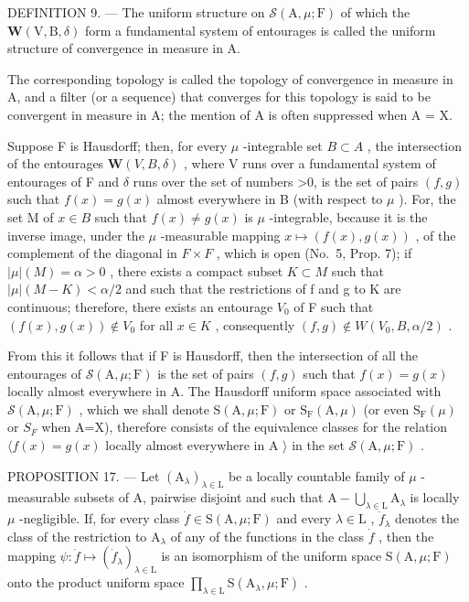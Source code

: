 DEFINITION 9. --- The uniform structure on \(\mathcal{S}(\mathrm{A},\mu;\mathrm{F})\) of which the \(\boldsymbol{W}(\mathrm{V},\mathrm{B},\delta)\) form a fundamental system of entourages is called the uniform structure of convergence in measure in A.

The corresponding topology is called the topology of convergence in measure in A, and a filter (or a sequence) that converges for this topology is said to be convergent in measure in A; the mention of A is often suppressed when A = X.

Suppose F is Hausdorff; then, for every \(\mu\) -integrable set \(B \subset A\) , the intersection of the entourages \(\boldsymbol{W}(V, B, \delta)\) , where V runs over a fundamental system of entourages of F and \(\delta\) runs over the set of numbers \textgreater0, is the set of pairs \((f, g)\) such that \(f(x) = g(x)\) almost everywhere in B (with respect to \(\mu\) ). For, the set M of \(x \in B\) such that \(f(x) \neq g(x)\) is \(\mu\) -integrable, because it is the inverse image, under the \(\mu\) -measurable mapping \(x \mapsto (f(x), g(x))\) , of the complement of the diagonal in \(F \times F\) , which is open (No.~5, Prop. 7); if \(|\mu|(M) = \alpha > 0\) , there exists a compact subset \(K \subset M\) such that \(|\mu|(M - K) < \alpha/2\) and such that the restrictions of f and g to K are continuous; therefore, there exists an entourage \(V_0\) of F such that \((f(x), g(x)) \notin V_0\) for all \(x \in K\) , consequently \((f, g) \notin W(V_0, B, \alpha/2)\) .

From this it follows that if F is Hausdorff, then the intersection of all the entourages of \(\mathcal{S}(\mathrm{A},\mu;\mathrm{F})\) is the set of pairs \((f,g)\) such that \(f(x)=g(x)\) locally almost everywhere in A. The Hausdorff uniform space associated with \(\mathcal{S}(\mathrm{A},\mu;\mathrm{F})\) , which we shall denote \(\mathrm{S}(\mathrm{A},\mu;\mathrm{F})\) or \(\mathrm{S}_{\mathrm{F}}(\mathrm{A},\mu)\) (or even \(\mathrm{S}_{\mathrm{F}}(\mu)\) or \(S_{F}\) when A=X), therefore consists of the equivalence classes for the relation \(\langle f(x)=g(x)\) locally almost everywhere in A \(\rangle\) in the set \(\mathcal{S}(\mathrm{A},\mu;\mathrm{F})\) .

PROPOSITION 17. --- Let \((\mathrm{A}_{\lambda})_{\lambda \in \mathrm{L}}\) be a locally countable family of \(\mu\) -measurable subsets of A, pairwise disjoint and such that \(\mathrm{A} - \bigcup_{\lambda \in \mathrm{L}} \mathrm{A}_{\lambda}\) is locally \(\mu\) -negligible. If, for every class \(\dot{f} \in \mathrm{S}(\mathrm{A}, \mu; \mathrm{F})\) and every \(\lambda \in \mathrm{L}\) , \(\dot{f}_{\lambda}\) denotes the class of the restriction to \(\mathrm{A}_{\lambda}\) of any of the functions in the class \(\dot{f}\) , then the mapping \(\psi: \dot{f} \mapsto (\dot{f}_{\lambda})_{\lambda \in \mathrm{L}}\) is an isomorphism of the uniform space \(\mathrm{S}(\mathrm{A}, \mu; \mathrm{F})\) onto the product uniform space \(\prod_{\lambda \in \mathrm{L}} \mathrm{S}(\mathrm{A}_{\lambda}, \mu; \mathrm{F})\) .

